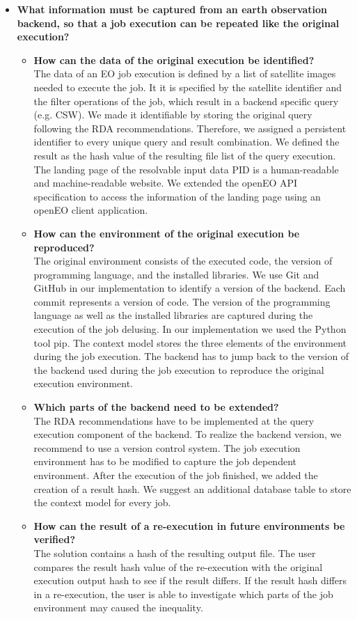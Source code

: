 \documentclass[draft,final]{vutinfth} %
\newcommand{\bgoesswe}[1]{#1}
\begin{document}
\begin{itemize}
	\item \textbf{What information must be captured from an earth observation backend, so that a job execution can be repeated like the original execution?}
	\begin{itemize}
		\item \textbf{How can the data of the original execution be identified?} \\
		\bgoesswe{The data of an EO job execution is defined by a list of satellite images needed to execute the job. It it is specified by the satellite identifier and the filter operations of the job, which result in a backend specific query (e.g. CSW). We made it} identifiable by storing the original query following the RDA recommendations. Therefore, we assigned a persistent identifier to every unique query and result combination. We defined the result as the hash value of the resulting file list of the query execution. The landing page of the resolvable input data PID is a human-readable and machine-readable website. \bgoesswe{We extended the openEO API specification to access the information of the landing page using an openEO client application.}
		\item \textbf{How can the environment of the original execution be reproduced?} \\
		The original environment consists of the \bgoesswe{executed} code, the version of programming language, and the installed libraries. We use Git and GitHub in our implementation to identify a version of the backend. \bgoesswe{Each commit represents a version of code.} \bgoesswe{The version of the programming language as well as the installed libraries are captured during the execution of the job del{using}. In our implementation we used the Python tool pip. The context model stores the three elements of the environment during the job execution.} The backend has to jump back to the version of the backend used during the job execution to reproduce the original execution environment.       
		\item \textbf{Which parts of the backend need to be extended?} \\
		The RDA recommendations have to be implemented at the query execution component of the backend. To realize the backend version, we recommend to use a version control system. The job execution environment has to be modified to capture the job dependent environment. After the execution of the job finished, we added the creation of a result hash. We suggest an additional database table to store the context model for every job.
		\item \textbf{How can the result of a re-execution in future environments be verified?} \\
		The solution contains a hash of the resulting output file. The user compares the result hash value of the re-execution with the original execution output hash to see if the result differs. \bgoesswe{If the result hash differs in a re-execution, the user is able to investigate which parts of the job environment may caused the inequality.}
	\end{itemize}


\end{itemize}
\end{document}
